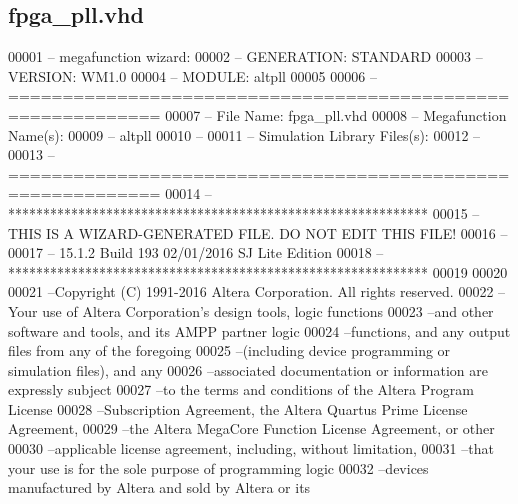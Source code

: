 \subsection{fpga\+\_\+pll.\+vhd}
\label{fpga__pll_8vhd_source}

\begin{DoxyCode}
00001 \textcolor{keyword}{-- megafunction wizard: %
00002 \textcolor{keyword}{-- GENERATION: STANDARD}
00003 \textcolor{keyword}{-- VERSION: WM1.0}
00004 \textcolor{keyword}{-- MODULE: altpll }
00005 
00006 \textcolor{keyword}{-- ============================================================}
00007 \textcolor{keyword}{-- File Name: fpga\_pll.vhd}
00008 \textcolor{keyword}{-- Megafunction Name(s):}
00009 \textcolor{keyword}{--          altpll}
00010 \textcolor{keyword}{--}
00011 \textcolor{keyword}{-- Simulation Library Files(s):}
00012 \textcolor{keyword}{--          }
00013 \textcolor{keyword}{-- ============================================================}
00014 \textcolor{keyword}{-- ************************************************************}
00015 \textcolor{keyword}{-- THIS IS A WIZARD-GENERATED FILE. DO NOT EDIT THIS FILE!}
00016 \textcolor{keyword}{--}
00017 \textcolor{keyword}{-- 15.1.2 Build 193 02/01/2016 SJ Lite Edition}
00018 \textcolor{keyword}{-- ************************************************************}
00019 
00020 
00021 \textcolor{keyword}{--Copyright (C) 1991-2016 Altera Corporation. All rights reserved.}
00022 \textcolor{keyword}{--Your use of Altera Corporation's design tools, logic functions }
00023 \textcolor{keyword}{--and other software and tools, and its AMPP partner logic }
00024 \textcolor{keyword}{--functions, and any output files from any of the foregoing }
00025 \textcolor{keyword}{--(including device programming or simulation files), and any }
00026 \textcolor{keyword}{--associated documentation or information are expressly subject }
00027 \textcolor{keyword}{--to the terms and conditions of the Altera Program License }
00028 \textcolor{keyword}{--Subscription Agreement, the Altera Quartus Prime License Agreement,}
00029 \textcolor{keyword}{--the Altera MegaCore Function License Agreement, or other }
00030 \textcolor{keyword}{--applicable license agreement, including, without limitation, }
00031 \textcolor{keyword}{--that your use is for the sole purpose of programming logic }
00032 \textcolor{keyword}{--devices manufactured by Altera and sold by Altera or its }
}
\end{DoxyCode}
